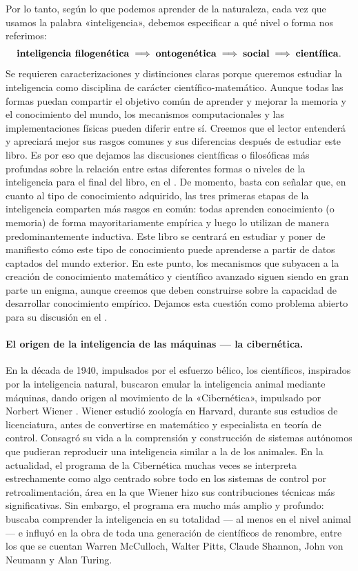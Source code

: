 \documentclass[../../book-main_es.tex]{subfiles}
\begin{document}
Por lo tanto, según lo que podemos aprender de la naturaleza, cada vez que 
usamos la palabra «inteligencia», debemos especificar a qué nivel o forma 
nos referimos:
\begin{equation}
    \text{\textbf{inteligencia filogenética}} \;
    \Longrightarrow \; \text{\textbf{ontogenética}} \; \Longrightarrow \;
    \text{\textbf{social}}
    \; \Longrightarrow \;
    \text{\textbf{científica}}.
\end{equation}
Se requieren caracterizaciones y distinciones claras porque queremos
estudiar la inteligencia como disciplina de carácter científico-matemático. Aunque
todas las formas puedan compartir el objetivo común de aprender y
mejorar la memoria y el conocimiento del mundo, los mecanismos
computacionales y las implementaciones físicas pueden diferir entre sí.
Creemos que el lector entenderá y apreciará mejor sus rasgos comunes
y sus diferencias después de estudiar este libro. Es por eso que 
dejamos las discusiones científicas o filosóficas más profundas sobre
la relación entre estas diferentes formas o niveles de la inteligencia
para el final del libro, en el . De momento, basta con señalar que, 
en cuanto al tipo de conocimiento adquirido, las tres primeras etapas de la 
inteligencia comparten más rasgos en común: todas aprenden conocimiento (o memoria) 
de forma mayoritariamente empírica y luego lo utilizan de manera predominantemente 
inductiva. Este libro se centrará en estudiar y poner de manifiesto cómo este tipo 
de conocimiento puede aprenderse a partir de datos captados del mundo exterior. 
En este punto, los mecanismos que subyacen a la creación de conocimiento matemático 
y científico avanzado siguen siendo en gran parte un enigma, aunque creemos que deben 
construirse sobre la capacidad de desarrollar conocimiento empírico. Dejamos esta 
cuestión como problema abierto para su discusión en el .

\paragraph{El origen de la inteligencia de las máquinas --- la cibernética.}
En la década de 1940, impulsados por el esfuerzo bélico, los científicos, 
inspirados por la inteligencia natural, buscaron emular la inteligencia 
animal mediante máquinas, dando origen al movimiento de la «Cibernética»,
impulsado por Norbert Wiener \cite{Kline-2011}. Wiener estudió zoología 
en Harvard, durante sus estudios de licenciatura, antes de convertirse 
en matemático y especialista en teoría de control. Consagró su vida a la 
comprensión y construcción de sistemas autónomos que pudieran reproducir
una inteligencia similar a la de los animales. En la actualidad, el
programa de la Cibernética muchas veces se interpreta estrechamente 
como algo centrado sobre todo en los sistemas de control por retroalimentación,
área en la que Wiener hizo sus contribuciones técnicas más significativas. 
Sin embargo, el programa era mucho más 
amplio y profundo: buscaba comprender la inteligencia en su
totalidad --- al menos en el nivel animal --- e influyó en la obra de toda
una generación de científicos de renombre, entre los que se cuentan
Warren McCulloch, Walter Pitts, Claude Shannon, John von Neumann y 
Alan Turing.
\end{document}
